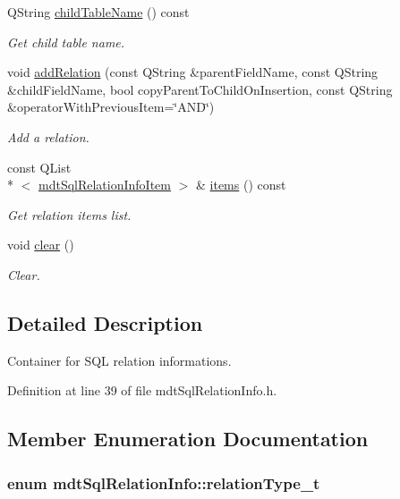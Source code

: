 \begin{DoxyCompactItemize}
Q\-String \hyperlink{classmdt_sql_relation_info_adb76a1ea4923af459c61717853fd6bf6}{child\-Table\-Name} () const 
\begin{DoxyCompactList}\small\item\em Get child table name. \end{DoxyCompactList}\item 
void \hyperlink{classmdt_sql_relation_info_a2e1c524c9e6db3d5359c2639a794f65f}{add\-Relation} (const Q\-String \&parent\-Field\-Name, const Q\-String \&child\-Field\-Name, bool copy\-Parent\-To\-Child\-On\-Insertion, const Q\-String \&operator\-With\-Previous\-Item=\char`\"{}A\-N\-D\char`\"{})
\begin{DoxyCompactList}\small\item\em Add a relation. \end{DoxyCompactList}\item 
const Q\-List\\*
$<$ \hyperlink{structmdt_sql_relation_info_item}{mdt\-Sql\-Relation\-Info\-Item} $>$ \& \hyperlink{classmdt_sql_relation_info_ac3978c4426c21c2a3db3bc3ad008aa8f}{items} () const 
\begin{DoxyCompactList}\small\item\em Get relation items list. \end{DoxyCompactList}\item 
void \hyperlink{classmdt_sql_relation_info_a547e97218a9b01cc50d70270c615b76d}{clear} ()
\begin{DoxyCompactList}\small\item\em Clear. \end{DoxyCompactList}\end{DoxyCompactItemize}


\subsection{Detailed Description}
Container for S\-Q\-L relation informations. 

Definition at line 39 of file mdt\-Sql\-Relation\-Info.\-h.



\subsection{Member Enumeration Documentation}
\hypertarget{classmdt_sql_relation_info_af36930de03b1cb16976f35987df2029e}{
\subsubsection[{relation\-Type\-\_\-t}]{\setlength{\rightskip}{0pt plus 5cm}enum {\bf mdt\-Sql\-Relation\-Info\-::relation\-Type\-\_\-t}}}\label{classmdt_sql_relation_info_af36930de03b1cb16976f35987df2029e}


